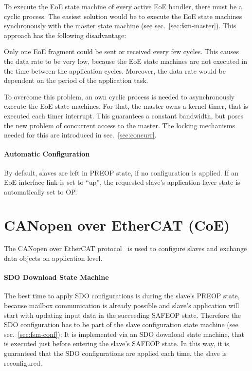 \documentclass[a4paper,12pt,BCOR6mm,bibtotoc,idxtotoc]{scrbook}
\begin{document}
To execute the EoE state machine of every active EoE handler, there must be a
cyclic process. The easiest solution would be to execute the EoE state
machines synchronously with the master state machine (see
sec.~\ref{sec:fsm-master}). This approach has the following disadvantage:

Only one EoE fragment could be sent or received every few cycles. This
causes the data rate to be very low, because the EoE state machines are not
executed in the time between the application cycles. Moreover, the data rate
would be dependent on the period of the application task.

To overcome this problem, an own cyclic process is needed to asynchronously
execute the EoE state machines. For that, the master owns a kernel timer, that
is executed each timer interrupt. This guarantees a constant bandwidth, but
poses the new problem of concurrent access to the master. The locking
mechanisms needed for this are introduced in sec.~\ref{sec:concurr}.

\paragraph{Automatic Configuration}

By default, slaves are left in PREOP state, if no configuration is applied. If
an EoE interface link is set to ``up'', the requested slave's
application-layer state is automatically set to OP.


\section{CANopen over EtherCAT (CoE)}
\label{sec:coe}

The CANopen over EtherCAT protocol~\cite[sec.~5.6]{alspec} is used to configure slaves and
exchange data objects on application level.

%
%

\paragraph{SDO Download State Machine}

The best time to apply SDO configurations is during the slave's PREOP state,
because mailbox communication is already possible and slave's application will
start with updating input data in the succeeding SAFEOP state. Therefore the
SDO configuration has to be part of the slave configuration state machine (see
sec.~\ref{sec:fsm-conf}): It is implemented via an SDO download state machine,
that is executed just before entering the slave's SAFEOP state. In this way,
it is guaranteed that the SDO configurations are applied each time, the slave
is reconfigured.
\end{document}
